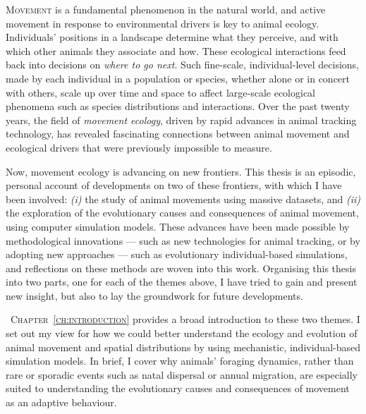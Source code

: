 \label{ch:abstract}

\lettrine{M}{ovement} is a fundamental phenomenon in the natural world, and active movement in response to environmental drivers is key to animal ecology.
Individuals' positions in a landscape determine what they perceive, and with which other animals they associate and how.
These ecological interactions feed back into decisions on \textit{where to go next}.
Such fine-scale, individual-level decisions, made by each individual in a population or species, whether alone or in concert with others, scale up over time and space to affect large-scale ecological phenomena such as species distributions and interactions.
Over the past twenty years, the field of \textit{movement ecology}, driven by rapid advances in animal tracking technology, has revealed fascinating connections between animal movement and ecological drivers that were previously impossible to measure.

Now, movement ecology is advancing on new frontiers.
This thesis is an episodic, personal account of developments on two of these frontiers, with which I have been involved: \textit{(i)} the study of animal movements using massive datasets, and \textit{(ii)} the exploration of the evolutionary causes and consequences of animal movement, using computer simulation models.
These advances have been made possible by methodological innovations --- such as new technologies for animal tracking, or by adopting new approaches --- such as evolutionary individual-based simulations, and reflections on these methods are woven into this work. 
Organising this thesis into two parts, one for each of the themes above, I have tried to gain and present new insight, but also to lay the groundwork for future developments.

{\scshape~Chapter~\ref{ch:introduction}} provides a broad introduction to these two themes.
I set out my view for how we could better understand the ecology and evolution of animal movement and spatial distributions by using mechanistic, individual-based simulation models.
In brief, I cover why animals' foraging dynamics, rather than rare or sporadic events such as natal dispersal or annual migration, are especially suited to understanding the evolutionary causes and consequences of movement as an adaptive behaviour.


